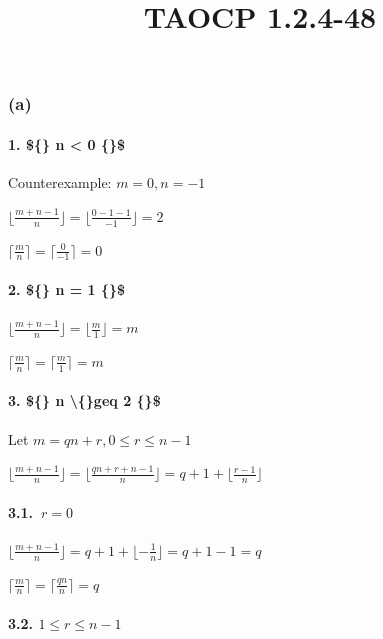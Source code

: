 \documentclass{article}
\title{TAOCP 1.2.4\mbox{-}48}
\begin{document}
\maketitle

\subsubsection*{(a)}

\paragraph*{1. \$\{\} n < 0 \{\}\$}

Counterexample: \( m = 0, n = -1 \)

\( \lfloor{\frac{m+n-1}{n}}\rfloor = \lfloor{\frac{0-1-1}{-1}}\rfloor = 2 \)

\( \lceil{\frac{m}{n}}\rceil = \lceil{\frac{0}{-1}}\rceil = 0 \)

\paragraph*{2. \$\{\} n = 1 \{\}\$}

\( \lfloor{\frac{m+n-1}{n}}\rfloor = \lfloor{\frac{m}{1}}\rfloor = m \)

\( \lceil{\frac{m}{n}}\rceil = \lceil{\frac{m}{1}}\rceil = m \)

\paragraph*{3. \$\{\} n \textbackslash\{\}geq 2 \{\}\$}

Let \( m = qn+r, 0 \leq r \leq n - 1 \)

\( \lfloor{\frac{m+n-1}{n}}\rfloor = \lfloor{\frac{qn+r+n-1}{n}}\rfloor = q + 1 + \lfloor{\frac{r-1}{n}}\rfloor \)

\paragraph*{3.1.\ \( r = 0 \)}

\( \lfloor{\frac{m+n-1}{n}}\rfloor = q + 1 + \lfloor{-\frac{1}{n}}\rfloor = q + 1 - 1 = q \)

\( \lceil{\frac{m}{n}}\rceil = \lceil{\frac{qn}{n}}\rceil = q \)

\paragraph*{3.2. \( 1 \leq r \leq n - 1 \)}
\end{document}
